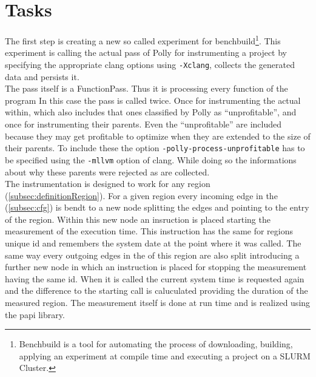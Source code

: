 \section{Tasks}
The first step is creating a new so called experiment for benchbuild\footnote{Benchbuild is a tool for automating the process of downloading, building, applying an experiment at compile time and executing a project on a SLURM Cluster.}.
This experiment is calling the actual pass of Polly for instrumenting a project by specifying the appropriate clang options using \texttt{-Xclang}, collects the generated data and persists it.\\
The pass itself is a FunctionPass.
Thus it is processing every function of the program
In this case the pass is called twice.
Once for instrumenting the actual \scops within, which also includes that ones classified by Polly as \enquote{unprofitable}, and once for instrumenting their parents.
Even the \enquote{unprofitable} \scops are included because they may get profitable to optimize when they are extended to the size of their parents.
To include these \scops the option \texttt{-polly-process-unprofitable} has to be specified using the \texttt{-mllvm} option of clang.
While doing so the informations about why these parents were rejected as \scops are collected.\\
The instrumentation is designed to work for any region (\autoref{subsec:definitionRegion}).
For a given region every incoming edge in the \cfg (\autoref{subsec:cfg}) is bendt to a new node splitting the edges and pointing to the entry of the region.
Within this new node an insruction is placed starting the measurement of the execution time.
This instruction has the same for regions unique id and remembers the system date at the point where it was called.
The same way every outgoing edges in the \cfg of this region are also split introducing a further new node in which an instruction is placed for stopping the measurement having the same id.
When it is called the current system time is requested again and the difference to the starting call is caluculated providing the duration of the measured region.
The measurement itself is done at run time and is realized using the papi library.
